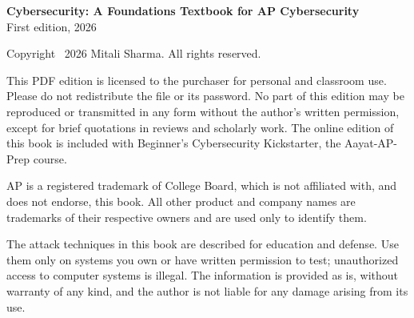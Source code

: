 \thispagestyle{empty}
\vspace*{\fill}
\begin{flushleft}
\small
\textbf{Cybersecurity: A Foundations Textbook for AP Cybersecurity}\\
First edition, 2026

\medskip
Copyright \textcopyright\ 2026 Mitali Sharma. All rights reserved.

\medskip
This PDF edition is licensed to the purchaser for personal and classroom use. Please do not
redistribute the file or its password. No part of this edition may be reproduced or transmitted in
any form without the author's written permission, except for brief quotations in reviews and
scholarly work. The online edition of this book is included with Beginner's Cybersecurity Kickstarter, the Aayat-AP-Prep course.

\medskip
AP is a registered trademark of College Board, which is not affiliated with, and does not endorse,
this book. All other product and company names are trademarks of their respective owners and are
used only to identify them.

\medskip
The attack techniques in this book are described for education and defense. Use them only on
systems you own or have written permission to test; unauthorized access to computer systems is
illegal. The information is provided as is, without warranty of any kind, and the author is not
liable for any damage arising from its use.
\end{flushleft}
\clearpage
